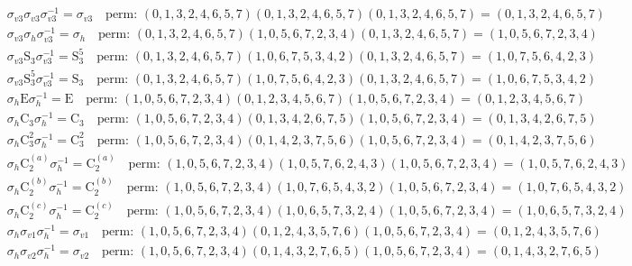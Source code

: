 \begin{align*}
& \sigma_{v3} \sigma_{v3} \sigma_{v3}^{-1} = \sigma_{v3} \quad \text{perm: }(0, 1, 3, 2, 4, 6, 5, 7)(0, 1, 3, 2, 4, 6, 5, 7)(0, 1, 3, 2, 4, 6, 5, 7) = (0, 1, 3, 2, 4, 6, 5, 7) \\
& \sigma_{v3} \sigma_{h} \sigma_{v3}^{-1} = \sigma_{h} \quad \text{perm: }(0, 1, 3, 2, 4, 6, 5, 7)(1, 0, 5, 6, 7, 2, 3, 4)(0, 1, 3, 2, 4, 6, 5, 7) = (1, 0, 5, 6, 7, 2, 3, 4) \\
& \sigma_{v3} \mathrm{S}_{3} \sigma_{v3}^{-1} = \mathrm{S}_{3}^{5} \quad \text{perm: }(0, 1, 3, 2, 4, 6, 5, 7)(1, 0, 6, 7, 5, 3, 4, 2)(0, 1, 3, 2, 4, 6, 5, 7) = (1, 0, 7, 5, 6, 4, 2, 3) \\
& \sigma_{v3} \mathrm{S}_{3}^{5} \sigma_{v3}^{-1} = \mathrm{S}_{3} \quad \text{perm: }(0, 1, 3, 2, 4, 6, 5, 7)(1, 0, 7, 5, 6, 4, 2, 3)(0, 1, 3, 2, 4, 6, 5, 7) = (1, 0, 6, 7, 5, 3, 4, 2) \\
& \sigma_{h} \mathrm{E} \sigma_{h}^{-1} = \mathrm{E} \quad \text{perm: }(1, 0, 5, 6, 7, 2, 3, 4)(0, 1, 2, 3, 4, 5, 6, 7)(1, 0, 5, 6, 7, 2, 3, 4) = (0, 1, 2, 3, 4, 5, 6, 7) \\
& \sigma_{h} \mathrm{C}_{3} \sigma_{h}^{-1} = \mathrm{C}_{3} \quad \text{perm: }(1, 0, 5, 6, 7, 2, 3, 4)(0, 1, 3, 4, 2, 6, 7, 5)(1, 0, 5, 6, 7, 2, 3, 4) = (0, 1, 3, 4, 2, 6, 7, 5) \\
& \sigma_{h} \mathrm{C}_{3}^{2} \sigma_{h}^{-1} = \mathrm{C}_{3}^{2} \quad \text{perm: }(1, 0, 5, 6, 7, 2, 3, 4)(0, 1, 4, 2, 3, 7, 5, 6)(1, 0, 5, 6, 7, 2, 3, 4) = (0, 1, 4, 2, 3, 7, 5, 6) \\
& \sigma_{h} \mathrm{C}_{2}^{(a)} \sigma_{h}^{-1} = \mathrm{C}_{2}^{(a)} \quad \text{perm: }(1, 0, 5, 6, 7, 2, 3, 4)(1, 0, 5, 7, 6, 2, 4, 3)(1, 0, 5, 6, 7, 2, 3, 4) = (1, 0, 5, 7, 6, 2, 4, 3) \\
& \sigma_{h} \mathrm{C}_{2}^{(b)} \sigma_{h}^{-1} = \mathrm{C}_{2}^{(b)} \quad \text{perm: }(1, 0, 5, 6, 7, 2, 3, 4)(1, 0, 7, 6, 5, 4, 3, 2)(1, 0, 5, 6, 7, 2, 3, 4) = (1, 0, 7, 6, 5, 4, 3, 2) \\
& \sigma_{h} \mathrm{C}_{2}^{(c)} \sigma_{h}^{-1} = \mathrm{C}_{2}^{(c)} \quad \text{perm: }(1, 0, 5, 6, 7, 2, 3, 4)(1, 0, 6, 5, 7, 3, 2, 4)(1, 0, 5, 6, 7, 2, 3, 4) = (1, 0, 6, 5, 7, 3, 2, 4) \\
& \sigma_{h} \sigma_{v1} \sigma_{h}^{-1} = \sigma_{v1} \quad \text{perm: }(1, 0, 5, 6, 7, 2, 3, 4)(0, 1, 2, 4, 3, 5, 7, 6)(1, 0, 5, 6, 7, 2, 3, 4) = (0, 1, 2, 4, 3, 5, 7, 6) \\
& \sigma_{h} \sigma_{v2} \sigma_{h}^{-1} = \sigma_{v2} \quad \text{perm: }(1, 0, 5, 6, 7, 2, 3, 4)(0, 1, 4, 3, 2, 7, 6, 5)(1, 0, 5, 6, 7, 2, 3, 4) = (0, 1, 4, 3, 2, 7, 6, 5) \\

\end{align*}
